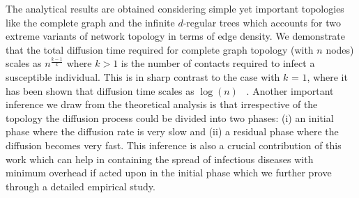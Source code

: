 The analytical results are obtained 
considering simple yet important topologies like the complete graph and the infinite $d$-regular trees which accounts for two extreme variants of network topology in terms of edge 
density. 
We demonstrate that the total diffusion time required for complete graph topology (with $n$ nodes) scales as $n^{\frac{k-1}{k}}$ where $k>1$ is the number 
of contacts required to infect a susceptible individual. 
This is in sharp contrast to the case with $k$ = $1$, where it has been shown that diffusion time 
scales as $\log{(n)}$ ~\cite{rumarSreadingPushPull,rumourSpreading_evolvingGraph_PushPull}.
Another important inference we draw from the theoretical analysis is that irrespective of the topology the diffusion process could be divided into two phases: (i) an initial phase where the diffusion rate is very slow and 
(ii) a residual phase where the diffusion becomes very fast.
This inference is also a crucial contribution of this work which can help in containing 
the spread of infectious diseases with minimum overhead if acted upon in the initial phase which we further prove through a detailed empirical study.


\medskip
